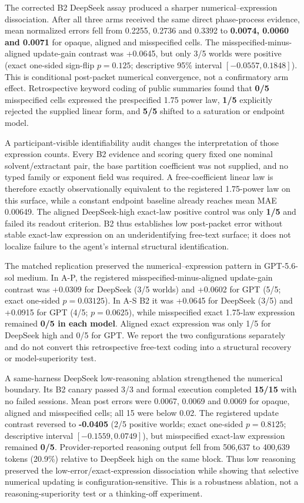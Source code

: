 \documentclass[10pt,twocolumn]{article}
\begin{document}
The corrected B2 DeepSeek assay produced a sharper numerical--expression
dissociation. After all three arms received the same direct
phase-process evidence, mean normalized errors fell from 0.2255, 0.2736
and 0.3392 to \textbf{0.0074, 0.0060 and 0.0071} for opaque, aligned and
misspecified cells. The misspecified-minus-aligned update-gain contrast
was +0.0645, but only 3/5 worlds were positive (exact one-sided
sign-flip \(p=0.125\); descriptive 95\% interval \([-0.0557,0.1848]\)).
This is conditional post-packet numerical convergence, not a
confirmatory arm effect. Retrospective keyword coding of public
summaries found that \textbf{0/5} misspecified cells expressed the
prespecified 1.75 power law, \textbf{1/5} explicitly rejected the
supplied linear form, and \textbf{5/5} shifted to a saturation or
endpoint model.

A participant-visible identifiability audit changes the interpretation
of those expression counts. Every B2 evidence and scoring query fixed
one nominal solvent/extractant pair, the base partition coefficient was
not supplied, and no typed family or exponent field was required. A
free-coefficient linear law is therefore exactly observationally
equivalent to the registered 1.75-power law on this surface, while a
constant endpoint baseline already reaches mean MAE 0.00649. The aligned
DeepSeek-high exact-law positive control was only \textbf{1/5} and
failed its readout criterion. B2 thus establishes low post-packet error
without stable exact-law expression on an underidentifying free-text
surface; it does not localize failure to the agent's internal structural
identification.

The matched replication preserved the numerical--expression pattern in
GPT-5.6-sol medium. In A-P, the registered misspecified-minus-aligned
update-gain contrast was +0.0309 for DeepSeek (3/5 worlds) and +0.0602
for GPT (5/5; exact one-sided \(p=0.03125\)). In A-S B2 it was +0.0645
for DeepSeek (3/5) and +0.0915 for GPT (4/5; \(p=0.0625\)), while
misspecified exact 1.75-law expression remained \textbf{0/5 in each
model}. Aligned exact expression was only 1/5 for DeepSeek high and 0/5
for GPT. We report the two configurations separately and do not convert
this retrospective free-text coding into a structural recovery or
model-superiority test.

A same-harness DeepSeek low-reasoning ablation strengthened the
numerical boundary. Its B2 canary passed 3/3 and formal execution
completed \textbf{15/15} with no failed sessions. Mean post errors were
0.0067, 0.0069 and 0.0069 for opaque, aligned and misspecified cells;
all 15 were below 0.02. The registered update contrast reversed to
\textbf{-0.0405} (2/5 positive worlds; exact one-sided \(p=0.8125\);
descriptive interval \([-0.1559,0.0749]\)), but misspecified exact-law
expression remained \textbf{0/5}. Provider-reported reasoning output
fell from 506,637 to 400,639 tokens (20.9\%) relative to DeepSeek high
on the same block. Thus low reasoning preserved the
low-error/exact-expression dissociation while showing that selective
numerical updating is configuration-sensitive. This is a robustness
ablation, not a reasoning-superiority test or a thinking-off experiment.
\end{document}
